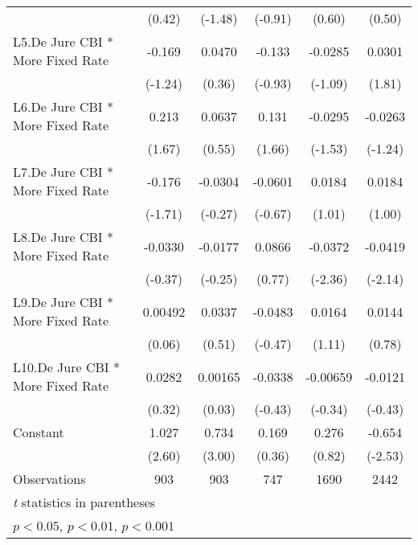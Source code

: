 {\begin{longtable}{l*{5}{c}}
                &   (0.42)         &  (-1.48)         &  (-0.91)         &   (0.60)         &   (0.50)         \\
\addlinespace
L5.De Jure CBI * More Fixed Rate&   -0.169         &   0.0470         &   -0.133         &  -0.0285         &   0.0301         \\
                &  (-1.24)         &   (0.36)         &  (-0.93)         &  (-1.09)         &   (1.81)         \\
\addlinespace
L6.De Jure CBI * More Fixed Rate&    0.213         &   0.0637         &    0.131         &  -0.0295         &  -0.0263         \\
                &   (1.67)         &   (0.55)         &   (1.66)         &  (-1.53)         &  (-1.24)         \\
\addlinespace
L7.De Jure CBI * More Fixed Rate&   -0.176         &  -0.0304         &  -0.0601         &   0.0184         &   0.0184         \\
                &  (-1.71)         &  (-0.27)         &  (-0.67)         &   (1.01)         &   (1.00)         \\
\addlinespace
L8.De Jure CBI * More Fixed Rate&  -0.0330         &  -0.0177         &   0.0866         &  -0.0372\sym{*}  &  -0.0419\sym{*}  \\
                &  (-0.37)         &  (-0.25)         &   (0.77)         &  (-2.36)         &  (-2.14)         \\
\addlinespace
L9.De Jure CBI * More Fixed Rate&  0.00492         &   0.0337         &  -0.0483         &   0.0164         &   0.0144         \\
                &   (0.06)         &   (0.51)         &  (-0.47)         &   (1.11)         &   (0.78)         \\
\addlinespace
L10.De Jure CBI * More Fixed Rate&   0.0282         &  0.00165         &  -0.0338         & -0.00659         &  -0.0121         \\
                &   (0.32)         &   (0.03)         &  (-0.43)         &  (-0.34)         &  (-0.43)         \\
\addlinespace
Constant        &    1.027\sym{*}  &    0.734\sym{**} &    0.169         &    0.276         &   -0.654\sym{*}  \\
                &   (2.60)         &   (3.00)         &   (0.36)         &   (0.82)         &  (-2.53)         \\
\midrule
Observations    &      903         &      903         &      747         &     1690         &     2442         \\
\bottomrule
\multicolumn{6}{l}{\footnotesize \textit{t} statistics in parentheses}\\
\multicolumn{6}{l}{\footnotesize \sym{*} \(p<0.05\), \sym{**} \(p<0.01\), \sym{***} \(p<0.001\)}\\
\end{longtable}
}
